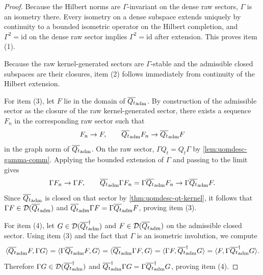 \documentclass[11pt]{article}
\theoremstyle{definition}
\theoremstyle{plain}
\theoremstyle{remark}
\newcommand{\Qt}{Q_t}
\newcommand{\id}{\mathrm{id}}
\begin{document}
\begin{proof}
Because the Hilbert norms are \(\Gamma\)-invariant on the dense raw sectors, \(\Gamma\) is an
isometry there.  Every isometry on a dense subspace extends uniquely by continuity to a bounded
isometric operator on the Hilbert completion, and \(\Gamma^2=\id\) on the dense raw sector implies
\(\Gamma^2=\id\) after extension. This proves item (1).

Because the raw kernel-generated sectors are \(\Gamma\)-stable and the admissible closed subspaces
are their closures, item (2) follows immediately from continuity of the Hilbert extension.

For item (3), let \(F\) lie in the domain of \(\overline{\Qt}_{\rm adm}\).
By construction of the admissible sector as the closure of the raw kernel-generated sector, there
exists a sequence \(F_n\) in the corresponding raw sector
such that
\[
F_n\to F,
\qquad
\overline{\Qt}_{\rm adm}F_n\to \overline{\Qt}_{\rm adm}F
\]
in the graph norm of \(\overline{\Qt}_{\rm adm}\).
On the raw sector, \(\Gamma\Qt=\Qt\Gamma\) by \cref{lem:uomdesc-gamma-comm}.
Applying the bounded extension of \(\Gamma\) and passing to the limit gives
\[
\Gamma F_n\to \Gamma F,
\qquad
\overline{\Qt}_{\rm adm}\Gamma F_n
=
\Gamma\overline{\Qt}_{\rm adm}F_n
\to
\Gamma\overline{\Qt}_{\rm adm}F.
\]
Since \(\overline{\Qt}_{\rm adm}\) is closed on that sector by \cref{thm:uomdesc-qt-kernel}, it
follows that \(\Gamma F\in\mathcal D(\overline{\Qt}_{\rm adm})\) and
\(
\overline{\Qt}_{\rm adm}\Gamma F=\Gamma\overline{\Qt}_{\rm adm}F
\),
proving item (3).

For item (4), let \(G\in\mathcal D(\overline{\Qt}_{\rm adm}^{\dagger})\) and
\(F\in\mathcal D(\overline{\Qt}_{\rm adm})\) on the admissible closed sector.
Using item (3) and the fact that \(\Gamma\) is an isometric involution, we compute
\[
\langle \overline{\Qt}_{\rm adm}F,\Gamma G\rangle
=
\langle \Gamma\overline{\Qt}_{\rm adm}F,G\rangle
=
\langle \overline{\Qt}_{\rm adm}\Gamma F,G\rangle
=
\langle \Gamma F,\overline{\Qt}_{\rm adm}^{\dagger}G\rangle
=
\langle F,\Gamma\overline{\Qt}_{\rm adm}^{\dagger}G\rangle.
\]
Therefore \(\Gamma G\in\mathcal D(\overline{\Qt}_{\rm adm}^{\dagger})\) and
\(
\overline{\Qt}_{\rm adm}^{\dagger}\Gamma G=\Gamma\overline{\Qt}_{\rm adm}^{\dagger}G
\),
proving item (4).


\end{proof}
\end{document}
